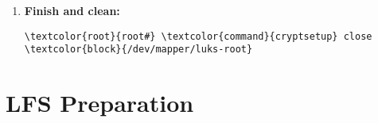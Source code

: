 \documentclass[10pt, a4paper, onecolumn, oneside, titlepage, openany]{book}
\begin{document}
\begin{enumerate}
\begin{enumerate}
\begin{Verbatim}[commandchars=\\\{\}]
\textcolor{root}{root#} \textcolor{command}{mkfs.btrfs} \textcolor{block}{/dev/mapper/luks-root}
\textcolor{root}{root#} \textcolor{command}{btrfs} filesystem label \textcolor{block}{/dev/mapper/luks-root}
LUKS-ROOT
\textcolor{root}{root#} \textcolor{command}{btrfstune} -U 00000000-0000-0000-0000-000000000003
\textcolor{block}{/dev/mapper/luks-root}
\textcolor{root}{>} y
\textcolor{root}{root#} \textcolor{command}{btrfs} check -p \textcolor{block}{/dev/mapper/luks-root} ; \textcolor{command}{echo} \$?
\end{Verbatim}
    \end{enumerate}
    \item \textbf{Finish and clean:}
\begin{Verbatim}[commandchars=\\\{\}]
\textcolor{root}{root#} \textcolor{command}{cryptsetup} close \textcolor{block}{/dev/mapper/luks-root}
\end{Verbatim}
\end{enumerate}


\chapter{LFS Preparation}
\end{document}
